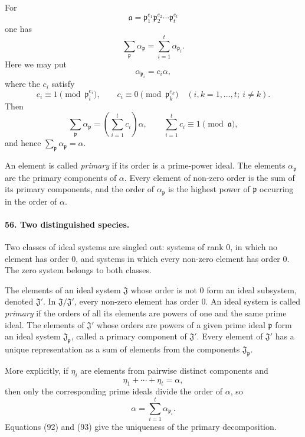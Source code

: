 \documentclass[11pt]{article}
\begin{document}
For
\[
  \mathfrak a=\mathfrak p_1^{e_1}\mathfrak p_2^{e_2}\cdots\mathfrak p_t^{e_t}
\]
one has
\begin{equation}
  \sum_{\mathfrak p}\alpha_{\mathfrak p}=\sum_{i=1}^{t}\alpha_{\mathfrak p_i}.
\tag{89}
\end{equation}
Here we may put
\begin{equation}
  \alpha_{\mathfrak p_i}=c_i\alpha,
\tag{90}
\end{equation}
where the $c_i$ satisfy
\begin{equation}
  c_i\equiv1\pmod{\mathfrak p_i^{e_i}},\qquad
  c_i\equiv0\pmod{\mathfrak p_k^{e_k}}
  \quad (i,k=1,\ldots,t;\ i\ne k).
\tag{91}
\end{equation}
Then
\[
  \sum_{\mathfrak p}\alpha_{\mathfrak p}
  =\left(\sum_{i=1}^{t}c_i\right)\alpha,
  \qquad
  \sum_{i=1}^{t}c_i\equiv1\pmod{\mathfrak a},
\]
and hence $\sum_{\mathfrak p}\alpha_{\mathfrak p}=\alpha$.

An element is called \emph{primary} if its order is a prime-power ideal. The elements $\alpha_{\mathfrak p}$ are the primary components of $\alpha$. Every element of non-zero order is the sum of its primary components, and the order of $\alpha_{\mathfrak p}$ is the highest power of $\mathfrak p$ occurring in the order of $\alpha$.

\paragraph{56. Two distinguished species.}
Two classes of ideal systems are singled out: systems of rank $0$, in which no element has order $0$, and systems in which every non-zero element has order $0$. The zero system belongs to both classes.

The elements of an ideal system $\mathfrak J$ whose order is not $0$ form an ideal subsystem, denoted $\mathfrak J'$. In $\mathfrak J/\mathfrak J'$, every non-zero element has order $0$. An ideal system is called \emph{primary} if the orders of all its elements are powers of one and the same prime ideal. The elements of $\mathfrak J'$ whose orders are powers of a given prime ideal $\mathfrak p$ form an ideal system $\mathfrak J_{\mathfrak p}$, called a primary component of $\mathfrak J'$. Every element of $\mathfrak J'$ has a unique representation as a sum of elements from the components $\mathfrak J_{\mathfrak p}$.

More explicitly, if $\eta_i$ are elements from pairwise distinct components and
\begin{equation}
  \eta_1+\cdots+\eta_t=\alpha,
\tag{92}
\end{equation}
then only the corresponding prime ideals divide the order of $\alpha$, so
\begin{equation}
  \alpha=\sum_{i=1}^{t}\alpha_{\mathfrak p_i}.
\tag{93}
\end{equation}
Equations (92) and (93) give the uniqueness of the primary decomposition.
\end{document}
